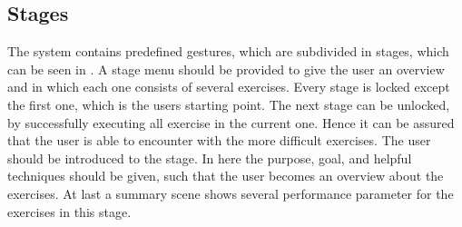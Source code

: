 \subsection{Stages}
The system contains predefined gestures, which are subdivided in stages, which can be seen in \textbf{}. A stage menu should be provided to give the user an overview and in which each one consists of several exercises. Every stage is locked except the first one, which is the users starting point. The next stage can be unlocked, by successfully executing all exercise in the current one. Hence it can be assured that the user is able to encounter with the more difficult exercises. The user should be introduced to the stage. In here the purpose, goal, and helpful techniques should be given, such that the user becomes an overview about the exercises. At last a summary scene shows several performance parameter for the exercises in this stage.

